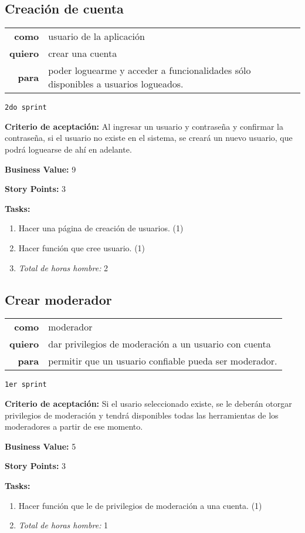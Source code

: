 \documentclass[hidelinks,a4paper,11pt, nofootinbib]{article}
\newcommand{\userstory}[3]{
\begin{tabular}{|r p{10cm}|}
  \hline
  \textbf{como} & #1 \\
  \textbf{quiero} & #2 \\
  \textbf{para} & #3 \\
  \hline
\end{tabular}

}
\newcommand{\critdeacep}[1]{\textbf{Criterio de aceptación:} #1

}
\newcommand{\busvalue}[1]{\textbf{Business Value:} #1

}
\newcommand{\storypoints}[1]{\textbf{Story Points:} #1

}
\newcommand{\primersprint}{\texttt{1er sprint}

}
\newcommand{\segundosprint}{\texttt{2do sprint}

}
\newcommand{\tasks}[1]{\textbf{Tasks:} 

#1}
\begin{document}
\subsection*{Creación de cuenta}
\userstory{usuario de la aplicación}{crear una cuenta}{poder loguearme y acceder a funcionalidades sólo disponibles a usuarios logueados.}
\segundosprint
\critdeacep{Al ingresar un usuario y contraseña y confirmar la contraseña, si el usuario no existe en el sistema, se creará un nuevo usuario, que podrá loguearse de ahí en adelante.}
\busvalue{9}
\storypoints{3}
\tasks{
  \begin{enumerate}
    \item Hacer una página de creación de usuarios. (1)
    \item Hacer función que cree usuario. (1)
    \item[] \textit{Total de horas hombre:} 2
  \end{enumerate}
}

\subsection*{Crear moderador}
\userstory{moderador}{dar privilegios de moderación a un usuario con cuenta}{permitir que un usuario confiable pueda ser moderador.}
\primersprint
\critdeacep{Si el usario seleccionado existe, se le deberán otorgar privilegios de moderación y tendrá disponibles todas las herramientas de los moderadores a partir de ese momento.}
\busvalue{5}
\storypoints{3}
\tasks{
  \begin{enumerate}
    \item Hacer función que le de privilegios de moderación a una cuenta. (1)
    \item[] \textit{Total de horas hombre:} 1
  \end{enumerate}
}
\end{document}
